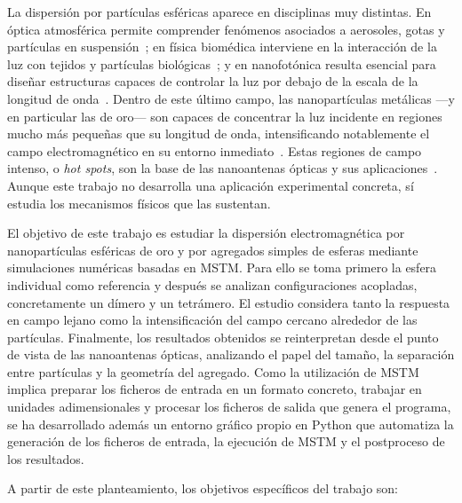 La dispersión por partículas esféricas aparece en disciplinas muy distintas. En
óptica atmosférica permite comprender fenómenos asociados a aerosoles, gotas y
partículas en suspensión~\cite{Mishchenko2002}; en física biomédica interviene
en la interacción de la luz con tejidos y partículas biológicas~\cite{Tuchin2015,Jacques2013};
y en nanofotónica resulta esencial para diseñar estructuras capaces de controlar
la luz por debajo de la escala de la longitud de onda~\cite{Novotny2011}. Dentro de
este último campo, las nanopartículas metálicas ---y en particular las de oro--- son
capaces de concentrar la luz incidente en regiones mucho más pequeñas que su
longitud de onda, intensificando notablemente el campo electromagnético en su
entorno inmediato~\cite{Myroshnychenko2008,Kolwas2013}. Estas regiones de campo
intenso, o \emph{hot spots}, son la base de las nanoantenas ópticas y sus
aplicaciones~\cite{Bharadwaj2009,Novotny2011}. Aunque este trabajo no desarrolla
una aplicación experimental concreta, sí estudia los mecanismos físicos que las
sustentan.


El objetivo de este trabajo es estudiar la dispersión electromagnética por
nanopartículas esféricas de oro y por agregados simples de esferas mediante
simulaciones numéricas basadas en MSTM. Para ello se toma primero la esfera
individual como referencia y después se analizan configuraciones acopladas,
concretamente un dímero y un tetrámero. El estudio considera tanto la respuesta
en campo lejano como la intensificación del campo cercano alrededor de las
partículas. Finalmente, los resultados obtenidos se reinterpretan desde el punto
de vista de las nanoantenas ópticas, analizando el papel del tamaño, la
separación entre partículas y la geometría del agregado. Como la utilización de
MSTM implica preparar los ficheros de entrada en un formato concreto, trabajar
en unidades adimensionales y procesar los ficheros de salida que genera el
programa, se ha desarrollado además un entorno gráfico propio en Python que
automatiza la generación de los ficheros de entrada, la ejecución de MSTM y el
postproceso de los resultados.

A partir de este planteamiento, los objetivos específicos del trabajo son:

